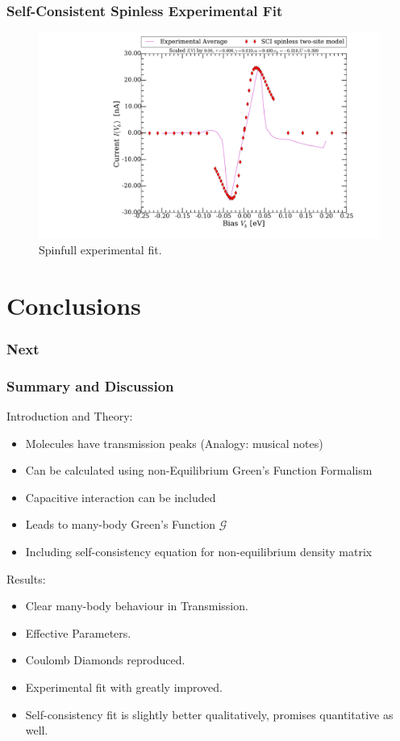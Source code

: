 \begin{frame}
    \frametitle{Self-Consistent Spinless Experimental Fit}
    \vspace{-3mm}
    \begin{figure}[!b] 
        \centering
        \includegraphics[height=.75\textheight, width=\textwidth, clip=true, trim=6cm 0cm 0cm 0cm]{res/selfconsistent.pdf}
        \vspace{-6mm}
        \caption{Spinfull experimental fit.}
    \end{figure} 
\end{frame}
\section{Conclusions}
\begin{frame}
    \frametitle{Next}
\end{frame} 
\begin{frame}
    \frametitle{Summary and Discussion}
    Introduction and Theory:
    \begin{itemize}
        \item Molecules have transmission peaks (Analogy: musical notes)
        \item Can be calculated using non-Equilibrium Green's Function Formalism
        \item Capacitive interaction can be included
        \item Leads to many-body Green's Function $\mathscr{G}$
        \item Including self-consistency equation for non-equilibrium density matrix 
    \end{itemize}
    Results:
    \begin{itemize} 
        \item Clear many-body behaviour in Transmission.
        \item Effective Parameters.
        \item Coulomb Diamonds reproduced.
        \item Experimental fit with \citet{perrin} greatly improved.
        \item Self-consistency fit is slightly better qualitatively, promises quantitative as well.
    \end{itemize}
\end{frame} 
